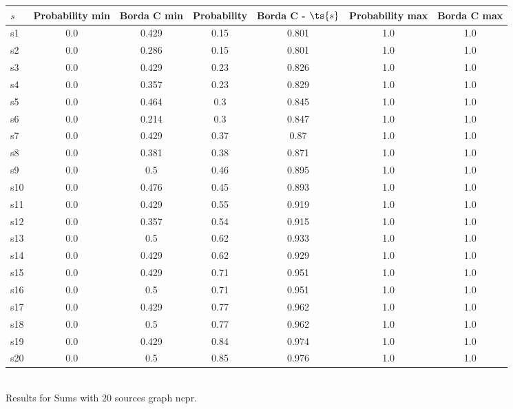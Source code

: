 \documentclass{article}
\begin{document}
\noindent\begin{tabular}{|l|c|c|c|c|c|c|}
\hline
$s$& Probability min & Borda C min & Probability & Borda C - $\ts{s}$ & Probability max & Borda C max\\
\hline
s1 &0.0 & 0.429 & 0.15 & 0.801 & 1.0 & 1.0\\
\hline
s2 &0.0 & 0.286 & 0.15 & 0.801 & 1.0 & 1.0\\
\hline
s3 &0.0 & 0.429 & 0.23 & 0.826 & 1.0 & 1.0\\
\hline
s4 &0.0 & 0.357 & 0.23 & 0.829 & 1.0 & 1.0\\
\hline
s5 &0.0 & 0.464 & 0.3 & 0.845 & 1.0 & 1.0\\
\hline
s6 &0.0 & 0.214 & 0.3 & 0.847 & 1.0 & 1.0\\
\hline
s7 &0.0 & 0.429 & 0.37 & 0.87 & 1.0 & 1.0\\
\hline
s8 &0.0 & 0.381 & 0.38 & 0.871 & 1.0 & 1.0\\
\hline
s9 &0.0 & 0.5 & 0.46 & 0.895 & 1.0 & 1.0\\
\hline
s10 &0.0 & 0.476 & 0.45 & 0.893 & 1.0 & 1.0\\
\hline
s11 &0.0 & 0.429 & 0.55 & 0.919 & 1.0 & 1.0\\
\hline
s12 &0.0 & 0.357 & 0.54 & 0.915 & 1.0 & 1.0\\
\hline
s13 &0.0 & 0.5 & 0.62 & 0.933 & 1.0 & 1.0\\
\hline
s14 &0.0 & 0.429 & 0.62 & 0.929 & 1.0 & 1.0\\
\hline
s15 &0.0 & 0.429 & 0.71 & 0.951 & 1.0 & 1.0\\
\hline
s16 &0.0 & 0.5 & 0.71 & 0.951 & 1.0 & 1.0\\
\hline
s17 &0.0 & 0.429 & 0.77 & 0.962 & 1.0 & 1.0\\
\hline
s18 &0.0 & 0.5 & 0.77 & 0.962 & 1.0 & 1.0\\
\hline
s19 &0.0 & 0.429 & 0.84 & 0.974 & 1.0 & 1.0\\
\hline
s20 &0.0 & 0.5 & 0.85 & 0.976 & 1.0 & 1.0\\
\hline
\end{tabular}\\

\noindent Results for Sums with 20 sources graph ncpr.
\end{document}
